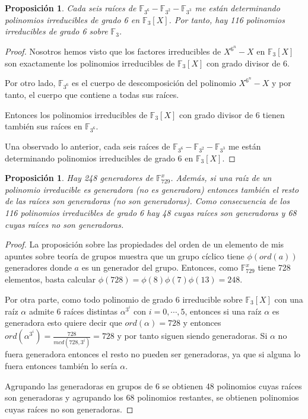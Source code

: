 \documentclass{article}
\theoremstyle{theorem-style}  %
\newtheorem{proposition}[theorem]{Proposición}
\theoremstyle{definition-style}
\theoremstyle{example-style}
\begin{document}
\begin{proposition}
	Cada seis raíces de $\mathbb{F}_{3^6} - \mathbb{F}_{3^2} - \mathbb{F}_{3^3}$ me están determinando polinomios irreducibles de grado 6 en $\mathbb{F}_3[X]$. Por tanto, hay 116 polinomios irreducibles de grado 6 sobre $\mathbb{F}_3$.
\end{proposition}
\begin{proof}
Nosotros hemos visto que los factores irreducibles de $X^{6^n} - X$ en $\mathbb{F}_3[X]$ son exactamente los polinomios irreducibles de $\mathbb{F}_3[X]$ con grado divisor de $6$. 

Por otro lado, $\mathbb{F}_{3^6}$ es el cuerpo de descomposición del polinomio $X^{6^n} - X$ y por tanto, el cuerpo que contiene a todas sus raíces. 

Entonces los polinomios irreducibles de $\mathbb{F}_3[X]$ con grado divisor de $6$ tienen también sus raíces en $\mathbb{F}_{3^6}$. 

Una observado lo anterior, cada seis raíces de $\mathbb{F}_{3^6} - \mathbb{F}_{3^2} - \mathbb{F}_{3^3}$ me están determinando polinomios irreducibles de grado 6 en $\mathbb{F}_3[X]$. 
\end{proof}

\begin{proposition}
	Hay 248 generadores de $\mathbb{F}_{729}^x$. Además, si una raíz de un polinomio irreducible es generadora (no es generadora) entonces también el resto de las raíces son generadoras (no son generadoras). Como consecuencia de los 116 polinomios irreducibles de grado 6 hay 48 cuyas raíces son generadoras y 68 cuyas raíces no son generadoras. 
\end{proposition}
\begin{proof}
	La proposición sobre las propiedades del orden de un elemento de mis apuntes sobre teoría de grupos muestra que un grupo cíclico tiene $\phi(ord(a))$ generadores donde $a$ es un generador del grupo. Entonces, como $\mathbb{F}_{729}^x$ tiene 728 elementos, basta calcular $\phi(728) = \phi(8) \phi(7) \phi(13) = 248$. 
	
	Por  otra parte, como todo polinomio de grado $6$ irreducible sobre $\mathbb{F}_3[X]$ con una raíz $\alpha$ admite $6$ raíces distintas $\alpha^{3^i}$ con $i = 0,\cdots,5$, entonces si una raíz $\alpha$ es generadora esto quiere decir que $ord(\alpha) = 728$ y entonces $ord(\alpha^{3^i}) = \frac{728}{mcd(728,3^i)} = 728$ y por tanto siguen siendo generadoras. Si $\alpha$ no fuera generadora entonces el resto no pueden ser generadoras, ya que si alguna lo fuera entonces también lo sería $\alpha$. 
	
	Agrupando las generadoras en grupos de $6$ se obtienen 48 polinomios cuyas raíces son generadoras y agrupando los 68 polinomios restantes, se obtienen polinomios cuyas raíces no son generadoras.
\end{proof}
\end{document}
